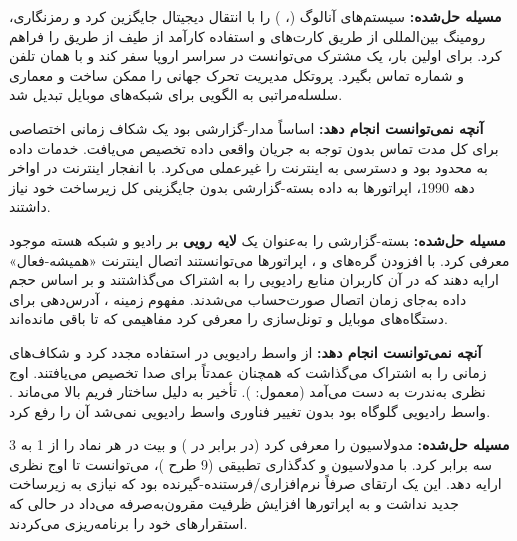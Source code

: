 

\CNchained{}

\textbf{مسیله حل‌شده:}  سیستم‌های آنالوگ  (، ) را با انتقال دیجیتال جایگزین کرد و رمزنگاری، رومینگ بین‌المللی از طریق کارت‌های  و استفاده کارآمد از طیف از طریق  را فراهم کرد. برای اولین بار، یک مشترک می‌توانست در سراسر اروپا سفر کند و با همان تلفن و شماره تماس بگیرد. پروتکل  مدیریت تحرک جهانی را ممکن ساخت و معماری سلسله‌مراتبی  به الگویی برای شبکه‌های موبایل تبدیل شد.

\textbf{آنچه نمی‌توانست انجام دهد:}  اساساً مدار-گزارشی بود  یک شکاف زمانی اختصاصی برای کل مدت تماس بدون توجه به جریان واقعی داده تخصیص می‌یافت. خدمات داده  به  محدود بود و دسترسی به اینترنت را غیرعملی می‌کرد. با انفجار اینترنت در اواخر دهه 1990، اپراتورها به داده بسته-گزارشی بدون جایگزینی کل زیرساخت  خود نیاز داشتند.


\textbf{مسیله حل‌شده:}  بسته-گزارشی را به‌عنوان یک \textbf{لایه رویی} بر رادیو و شبکه هسته موجود  معرفی کرد. با افزودن گره‌های  و ، اپراتورها می‌توانستند اتصال اینترنت «همیشه-فعال» ارایه دهند که در آن کاربران منابع رادیویی را به اشتراک می‌گذاشتند و بر اساس حجم داده به‌جای زمان اتصال صورت‌حساب می‌شدند.  مفهوم زمینه ، آدرس‌دهی  برای دستگاه‌های موبایل و تونل‌سازی  را معرفی کرد  مفاهیمی که تا  باقی مانده‌اند.

\textbf{آنچه نمی‌توانست انجام دهد:}  از واسط رادیویی  در  استفاده مجدد کرد و شکاف‌های زمانی را به اشتراک می‌گذاشت که همچنان عمدتاً برای صدا تخصیص می‌یافتند. اوج نظری  به‌ندرت به دست می‌آمد (معمول: ). تأخیر به دلیل ساختار فریم  بالا می‌ماند . واسط رادیویی گلوگاه بود  بدون تغییر فناوری واسط رادیویی نمی‌شد آن را رفع کرد.


\textbf{مسیله حل‌شده:}  مدولاسیون  را معرفی کرد (در برابر  در ) و بیت در هر نماد را از 1 به 3 سه برابر کرد. با مدولاسیون و کدگذاری تطبیقی (9 طرح )،  می‌توانست تا اوج نظری  ارایه دهد. این یک ارتقای صرفاً نرم‌افزاری/\allowbreak{}فرستنده-گیرنده بود که نیازی به زیرساخت جدید نداشت و به اپراتورها افزایش ظرفیت مقرون‌به‌صرفه می‌داد در حالی که استقرارهای  خود را برنامه‌ریزی می‌کردند.

